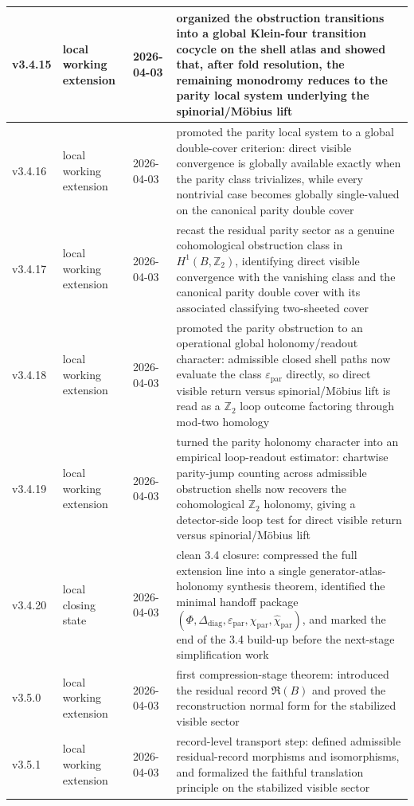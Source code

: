 {\begin{longtable}{|p{}|p{}|p{}|p{}|}
\hline
v3.4.15 & local working extension & 2026-04-03 & organized the obstruction transitions into a global Klein-four transition cocycle on the shell atlas and showed that, after fold resolution, the remaining monodromy reduces to the parity local system underlying the spinorial/M\"obius lift \\
\hline
v3.4.16 & local working extension & 2026-04-03 & promoted the parity local system to a global double-cover criterion: direct visible convergence is globally available exactly when the parity class trivializes, while every nontrivial case becomes globally single-valued on the canonical parity double cover \\
\hline
v3.4.17 & local working extension & 2026-04-03 & recast the residual parity sector as a genuine cohomological obstruction class in $H^1(B,\mathbb Z_2)$, identifying direct visible convergence with the vanishing class and the canonical parity double cover with its associated classifying two-sheeted cover \\
\hline
v3.4.18 & local working extension & 2026-04-03 & promoted the parity obstruction to an operational global holonomy/readout character: admissible closed shell paths now evaluate the class $\varepsilon_{\mathrm{par}}$ directly, so direct visible return versus spinorial/M\"obius lift is read as a $\mathbb Z_2$ loop outcome factoring through mod-two homology \\
v3.4.19 & local working extension & 2026-04-03 & turned the parity holonomy character into an empirical loop-readout estimator: chartwise parity-jump counting across admissible obstruction shells now recovers the cohomological $\mathbb Z_2$ holonomy, giving a detector-side loop test for direct visible return versus spinorial/M\"obius lift \\
v3.4.20 & local closing state & 2026-04-03 & clean 3.4 closure: compressed the full extension line into a single generator-atlas-holonomy synthesis theorem, identified the minimal handoff package $(\Phi,\Delta_{\mathrm{diag}},\varepsilon_{\mathrm{par}},\chi_{\mathrm{par}},\widehat\chi_{\mathrm{par}})$, and marked the end of the 3.4 build-up before the next-stage simplification work \\
\hline
v3.5.0 & local working extension & 2026-04-03 & first compression-stage theorem: introduced the residual record $\mathfrak R(B)$ and proved the reconstruction normal form for the stabilized visible sector \\
\hline
v3.5.1 & local working extension & 2026-04-03 & record-level transport step: defined admissible residual-record morphisms and isomorphisms, and formalized the faithful translation principle on the stabilized visible sector \\

\end{longtable}}
